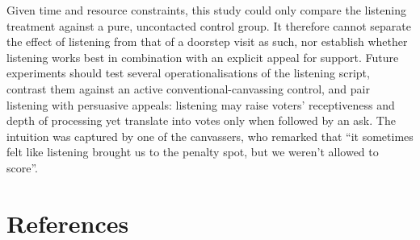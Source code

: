 \documentclass[11pt,a4paper]{scrartcl}
\begin{document}
Given time and resource constraints, this study could only compare the listening treatment against a pure, uncontacted control group. It therefore cannot separate the effect of listening from that of a doorstep visit as such, nor establish whether listening works best in combination with an explicit appeal for support. Future experiments should test several operationalisations of the listening script, contrast them against an active conventional-canvassing control, and pair listening with persuasive appeals: listening may raise voters' receptiveness and depth of processing yet translate into votes only when followed by an ask. The intuition was captured by one of the canvassers, who remarked that \enquote{it sometimes felt like listening brought us to the penalty spot, but we weren't allowed to score}.


\section{References}

\printbibliography[heading=none]
\end{document}
